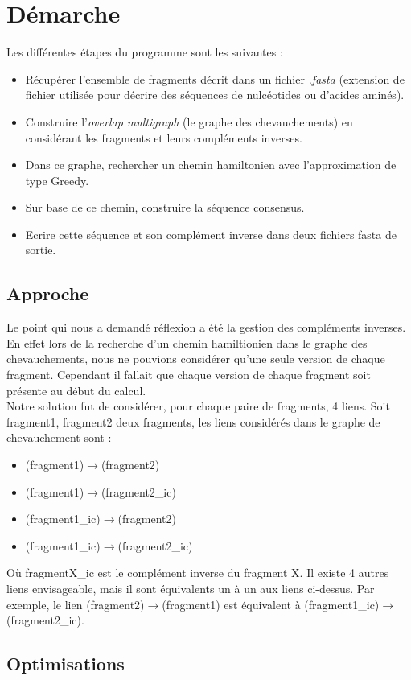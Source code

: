 \documentclass[11pt]{article}
\begin{document}
\section{Démarche}
Les différentes étapes du programme sont les suivantes :
\begin{itemize}
	\item Récupérer l'ensemble de fragments décrit dans un fichier \emph{.fasta} (extension de fichier utilisée pour décrire des séquences de nulcéotides ou d'acides aminés).
	\item Construire l'\emph{overlap multigraph} (le graphe des chevauchements) en considérant les fragments et leurs compléments inverses.
	\item Dans ce graphe, rechercher un chemin hamiltonien avec l'approximation de type Greedy.
	\item Sur base de ce chemin, construire la séquence consensus.
	\item Ecrire cette séquence et son complément inverse dans deux fichiers fasta de sortie.
\end{itemize}
\subsection*{Approche}
Le point qui nous a demandé réflexion a été la gestion des compléments inverses. En effet lors de la recherche d'un chemin hamiltionien dans le graphe des chevauchements, nous ne pouvions considérer qu'une seule version de chaque fragment. Cependant il fallait que chaque version de chaque fragment soit présente au début du calcul.\\
Notre solution fut de considérer, pour chaque paire de fragments, 4 liens. Soit fragment1, fragment2 deux fragments, les liens considérés dans le graphe de chevauchement sont :
\begin{itemize}
	\item (fragment1)$\rightarrow$(fragment2)
	\item (fragment1)$\rightarrow$(fragment2\_ic)
	\item (fragment1\_ic)$\rightarrow$(fragment2)
	\item (fragment1\_ic)$\rightarrow$(fragment2\_ic)
\end{itemize}
Où fragmentX\_ic est le complément inverse du fragment X.
Il existe 4 autres liens envisageable, mais il sont équivalents un à un aux liens ci-dessus. Par exemple, le lien (fragment2)$\rightarrow$(fragment1) est équivalent à (fragment1\_ic)$\rightarrow$(fragment2\_ic).
\subsection*{Optimisations}
\end{document}
